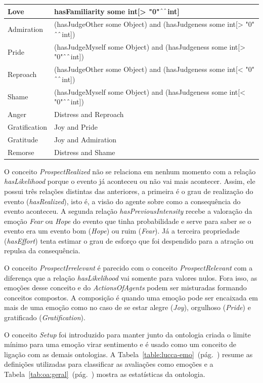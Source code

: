 \begin{table}[pt]
\begin{center}
\begin{tabular}{|p{20mm}|p{120mm}|}
		Love & hasFamiliarity some int[> "0"$\UP\UP$int]\\ \hline
		Admiration & (hasJudgeOther some Object) and (hasJudgeness some int[> "0"$\UP\UP$int])\\ \hline
		Pride & (hasJudgeMyself some Object) and (hasJudgeness some int[> "0"$\UP\UP$int])\\ \hline
		Reproach & (hasJudgeOther some Object) and (hasJudgeness some int[< "0"$\UP\UP$int])\\ \hline
		Shame & (hasJudgeMyself some Object) and (hasJudgeness some int[< "0"$\UP\UP$int])\\ \hline
		Anger & Distress and Reproach \\ \hline
		Gratification &  Joy and Pride \\ \hline
		Gratitude & Joy and Admiration \\ \hline
		Remorse & Distress and Shame \\ \hline
	\end{tabular}
	\end{center}
\end{table}

O conceito \emph{ProspectRealized} não se relaciona em nenhum momento com a
relação \emph{hasLikelihood} porque o evento já aconteceu ou não vai mais
acontecer. Assim, ele possui três relações distintas das anteriores, a
primeira é o grau de realização do evento (\emph{hasRealized}), isto é, a
visão do agente sobre como a consequência do evento aconteceu. A segunda
relação \emph{hasPreviousIntensity} recebe a valoração da emoção \emph{Fear}
ou \emph{Hope} do evento que tinha probabilidade e serve para saber se o evento era
um evento bom (\emph{Hope}) ou ruim (\emph{Fear}). Já a terceira propriedade
(\emph{hasEffort}) tenta estimar o grau de esforço que foi despendido para a
atração ou repulsa da consequência.

O conceito \emph{ProspectIrrelevant} é parecido com o conceito
\emph{ProspectRelevant} com a diferença que a relação \emph{hasLikelihood} vai
somente para valores nulos. Fora isso, as emoções desse conceito e do
\emph{ActionsOfAgents} podem ser misturadas formando conceitos compostos.
A composição é quando uma emoção pode ser encaixada em mais de uma emoção
como no caso de se estar alegre (\emph{Joy}), orgulhoso (\emph{Pride}) e
gratificado (\emph{Gratification}).

O conceito \emph{Setup} foi introduzido para manter junto da ontologia criada
o limite mínimo para uma emoção virar sentimento\dev{} e é
usado como um conceito de ligação com as demais ontologias.  A
Tabela~\ref{table:lucca-emo}~(pág.~\pageref{table:lucca-emo}) resume as
definições utilizadas para classificar as avaliações como emoções e a
Tabela~\ref{tab:oa:geral}~(pág.~\pageref{tab:oa:geral}) mostra as estatísticas
da ontologia.

